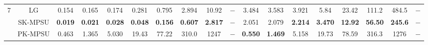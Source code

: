 \begin{table}[p]
\begin{adjustbox}{angle=90,center,scale=0.85}
\begin{tabular}{|c|c|c|c|c|c|c|c|c|c|c|c|c|c|c|c|c|c|}
\multirow{3}{*}{7} 
 & LG & \multicolumn{1}{c|}{0.154} & \multicolumn{1}{c|}{0.165} & \multicolumn{1}{c|}{0.174} & \multicolumn{1}{c|}{0.281} & \multicolumn{1}{c|}{0.795} & \multicolumn{1}{c|}{2.894} & \multicolumn{1}{c|}{10.92} & \multicolumn{1}{c|}{$-$} & \multicolumn{1}{c|}{3.484} & \multicolumn{1}{c|}{3.583} & \multicolumn{1}{c|}{3.921} & \multicolumn{1}{c|}{5.84} & \multicolumn{1}{c|}{23.42} & \multicolumn{1}{c|}{111.2} & \multicolumn{1}{c|}{484.5} & \multicolumn{1}{c|}{$-$} \\ \cline{2-18} 
 & SK-MPSU & \multicolumn{1}{c|}{\textbf{0.019}} & \multicolumn{1}{c|}{\textbf{0.021}} & \multicolumn{1}{c|}{\textbf{0.028}} & \multicolumn{1}{c|}{\textbf{0.048}} & \multicolumn{1}{c|}{\textbf{0.156}} & \multicolumn{1}{c|}{\textbf{0.607}} & \multicolumn{1}{c|}{\textbf{2.817}} & \multicolumn{1}{c|}{$-$} & \multicolumn{1}{c|}{2.051} & \multicolumn{1}{c|}{2.079} & \multicolumn{1}{c|}{\textbf{2.214}} & \multicolumn{1}{c|}{\textbf{3.470}} & \multicolumn{1}{c|}{\textbf{12.92}} & \multicolumn{1}{c|}{\textbf{56.50}} & \multicolumn{1}{c|}{\textbf{245.6}} & \multicolumn{1}{c|}{$-$} \\ \cline{2-18} 
 & PK-MPSU & \multicolumn{1}{c|}{0.463} & \multicolumn{1}{c|}{1.365} & \multicolumn{1}{c|}{5.030} & \multicolumn{1}{c|}{19.43} & \multicolumn{1}{c|}{77.22} & \multicolumn{1}{c|}{310.0} & \multicolumn{1}{c|}{1247} & \multicolumn{1}{c|}{$-$} & \multicolumn{1}{c|}{\textbf{0.550}} & \multicolumn{1}{c|}{\textbf{1.469}} & \multicolumn{1}{c|}{5.158} & \multicolumn{1}{c|}{19.73} & \multicolumn{1}{c|}{78.59} & \multicolumn{1}{c|}{316.3} & \multicolumn{1}{c|}{1276} & \multicolumn{1}{c|}{$-$} \\ \hline


\end{tabular}
\end{adjustbox}
\end{table}
